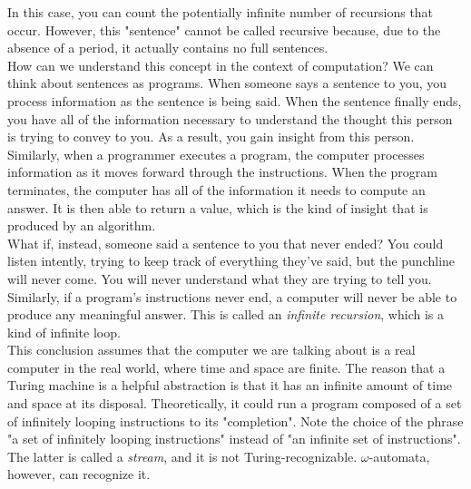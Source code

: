 \begin{tcolorbox}[breakable, enhanced, colback=textbook-blue, sharp corners]
	In this case, you can count the potentially infinite number of recursions that occur. However, this "sentence" cannot be called recursive because, due to the absence of a period, it actually contains no full sentences. \\
	
	How can we understand this concept in the context of computation? We can think about sentences as programs. When someone says a sentence to you, you process information as the sentence is being said. When the sentence finally ends, you have all of the information necessary to understand the thought this person is trying to convey to you. As a result, you gain insight from this person. Similarly, when a programmer executes a program, the computer processes information as it moves forward through the instructions. When the program terminates, the computer has all of the information it needs to compute an answer. It is then able to return a value, which is the kind of insight that is produced by an algorithm. \\
	
	What if, instead, someone said a sentence to you that never ended? You could listen intently, trying to keep track of everything they've said, but the punchline will never come. You will never understand what they are trying to tell you. Similarly, if a program's instructions never end, a computer will never be able to produce any meaningful answer. This is called an \textit{infinite recursion}, which is a kind of infinite loop. \\
	
	This conclusion assumes that the computer we are talking about is a real computer in the real world, where time and space are finite. The reason that a Turing machine is a helpful abstraction is that it has an infinite amount of time and space at its disposal. Theoretically, it could run a program composed of a set of infinitely looping instructions to its "completion". Note the choice of the phrase "a set of infinitely looping instructions" instead of "an infinite set of instructions". The latter is called a \textit{stream}, and it is not Turing-recognizable. $\omega$-automata, however, can recognize it. \\
	

\end{tcolorbox}
